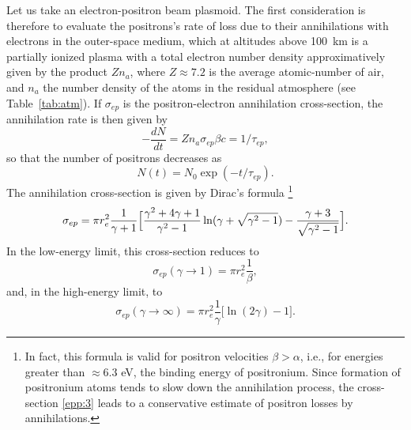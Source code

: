 \documentclass [12pt,a4paper,     ]{report} %
\begin{document}
Let us take an electron-positron beam plasmoid.  The first consideration is therefore to evaluate the positrons's rate of loss due to their annihilations with electrons in the outer-space medium, which at altitudes above 100~km is a partially ionized plasma with a total electron number density approximatively given by the product $Zn_a$, where $Z\approx 7.2$ is the average atomic-number of air, and $n_a$ the number density of the atoms in the residual atmosphere (see Table~\ref{tab:atm}).  If $\sigma_{ep}$ is the positron-electron annihilation cross-section, the annihilation rate is then given by
%
\begin{equation} \label{epp:1} 
      - \frac{dN}{dt}  = Zn_a \sigma_{ep} \beta c = 1/\tau_{ep},
\end{equation}
%
so that the number of positrons decreases as
%
\begin{equation} \label{epp:2} 
   N(t) = N_0 \exp (-t / \tau_{ep}).
\end{equation}
%
The annihilation cross-section is given by Dirac's formula \cite{DIRAC1930-}\footnote{In fact, this formula is valid for positron velocities $\beta > \alpha$, i.e., for energies greater than $\approx 6.3$ eV, the binding energy of positronium.  Since formation of positronium atoms tends to slow down the annihilation process, the cross-section \eqref{epp:3} leads to a conservative estimate of positron losses by annihilations.}
%
\begin{equation} \label{epp:3} 
   \sigma_{ep} = \pi r_e^2 \frac{1}{\gamma+1} \Bigl[
    \frac{\gamma^2+4\gamma+1}{\gamma^2-1} \ln(\gamma + \sqrt{\gamma^2-1})
                  - \frac{\gamma+3}{\sqrt{\gamma^2-1}}   \Bigr].
\end{equation}
%
In the low-energy limit, this cross-section reduces to
%
\begin{equation} \label{epp:4} 
   \sigma_{ep}(\gamma \rightarrow 1) = \pi r_e^2 \frac{1}{\beta},
\end{equation}
%
and, in the high-energy limit, to
%
\begin{equation} \label{epp:5} 
   \sigma_{ep}(\gamma \rightarrow \infty) = \pi r_e^2 \frac{1}{\gamma} 
                 \bigl[ \ln (2\gamma) -1 \bigr].
\end{equation}
%
\end{document}
